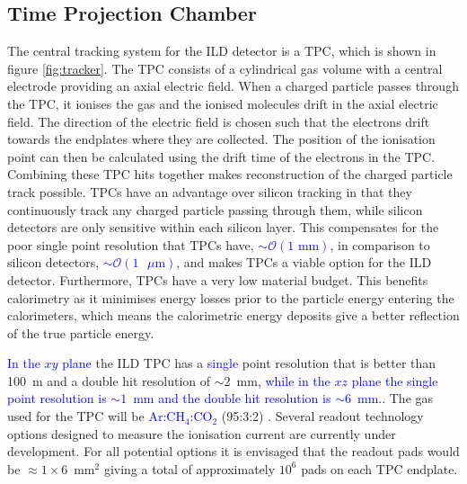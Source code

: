
\subsection{Time Projection Chamber}
The central tracking system for the ILD detector is a TPC, which is shown in figure \ref{fig:tracker}.  The TPC consists of a cylindrical gas volume with a central electrode providing an axial electric field.  When a charged particle passes through the TPC, it ionises the gas and the ionised molecules drift in the axial electric field.  The direction of the electric field is chosen such that the electrons drift towards the endplates where they are collected.  The position of the ionisation point can then be calculated using the drift time of the electrons in the TPC.  Combining these TPC hits together makes reconstruction of the charged particle track possible.  TPCs have an advantage over silicon tracking in that they continuously track any charged particle passing through them, while silicon detectors are only sensitive within each silicon layer.  This compensates for the poor single point resolution that TPCs have, \textcolor{blue}{$\sim \mathcal{O}(1 \text{ mm})$}, in comparison to silicon detectors, \textcolor{blue}{$\sim \mathcal{O}(1 \text{ }\mu\text{m})$}, and makes TPCs a viable option for the ILD detector.  Furthermore, TPCs have a very low material budget.  This benefits calorimetry as it minimises energy losses prior to the particle energy entering the calorimeters, which means the calorimetric energy deposits give a better reflection of the true particle energy.  

\textcolor{blue}{In the $xy$ plane} the ILD TPC has a \textcolor{blue}{single} point resolution that is better than 100~{\mu}m and a double hit resolution of $\sim$2~mm\textcolor{blue}{, while in the $xz$ plane the single point resolution is $\sim 1$~mm and the double hit resolution is $\sim 6$~mm.}. The gas used for the TPC will be \textcolor{blue}{Ar:$\text{CH}_4$:$\text{CO}_{2}$} (95:3:2) \cite{arXiv:1006.3396}.  Several readout technology options designed to measure the ionisation current are currently under development.  For all potential options it is envisaged that the readout pads would be $\approx 1 \times 6$~$\text{mm}^{2}$ giving a total of approximately $10^{6}$ pads on each TPC endplate.

